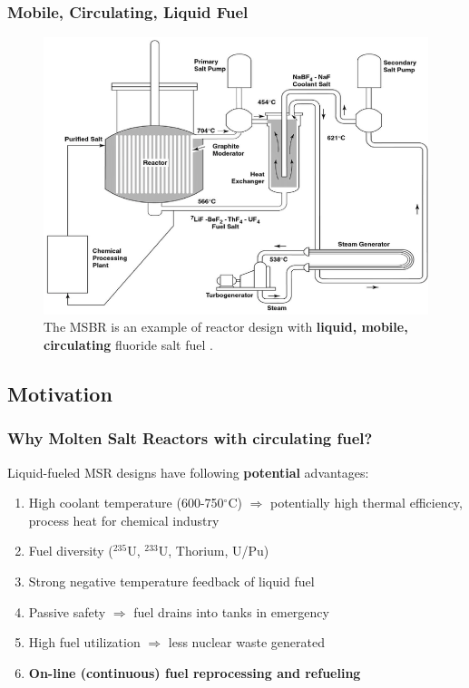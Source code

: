 \begin{frame}
\frametitle{Mobile, Circulating, Liquid Fuel}
\begin{figure}[t]
\includegraphics[height=0.58\textwidth]{./images/msbr_scheme.png}
\caption{The \gls{MSBR} is an example of reactor design with \textbf{liquid, mobile, circulating} fluoride salt fuel \cite{rosenthal_molten-salt_1970}.}
\end{figure}   

\end{frame}

\subsection{Motivation}


\begin{frame}
\frametitle{Why Molten Salt Reactors with circulating fuel?}
\begin{block}{Liquid-fueled MSR 
		designs have following \textbf{potential} advantages:}
	\begin{enumerate}
		\itemsep1em
		\item High coolant temperature (600-750$^{\circ}$C) 
		$\Rightarrow$ potentially high thermal efficiency, process 
		heat for chemical industry
		\item Fuel diversity ($^{235}$U, $^{233}$U, Thorium, U/Pu)
		\item Strong negative temperature feedback of liquid fuel
		\item Passive safety $\Rightarrow$ fuel drains into tanks 
		in emergency
		\item High fuel utilization $\Rightarrow$ less nuclear 
		waste generated
		\item<2> \textbf{On-line (continuous) fuel reprocessing and refueling}
	\end{enumerate}
\end{block}

\end{frame}

